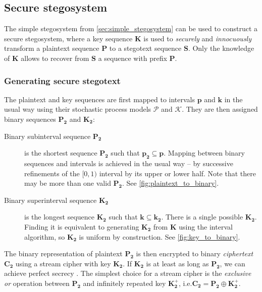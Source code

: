 \documentclass[draft]{IIBproject}
\makeatletter
\DeclareRobustCommand*{\ie}{i.e.\@\xspace}
\DeclareRobustCommand*{\AbbreviationWithDot}[1]{\@ifnextchar{.}{#1}{#1.\@\xspace}}
\DeclareRobustCommand*{\iid}{\AbbreviationWithDot{i.i.d}}
\makeatother
\begin{document}
\FloatBarrier
\subsection{Secure stegosystem}
\label{sec:secure_stegosystem}

The simple stegosystem from \cref{sec:simple_stegosystem} can be used to construct a secure stegosystem, where a key sequence $\mathbf K$ is used to \emph{securely} and \emph{innocuously} transform a plaintext sequence $\mathbf P$ to a stegotext sequence $\mathbf S$. Only the knowledge of $\mathbf K$ allows to recover from $\mathbf S$ a sequence with prefix $\mathbf P$.

\subsubsection{Generating secure stegotext}

The plaintext and key sequences are first mapped to intervals $\mathbf p$ and $\mathbf k$ in the usual way using their stochastic process models $\mathcal P$ and $\mathcal K$. They are then assigned binary sequences $\mathbf{P_2}$ and $\mathbf{K_2}$:

\begin{description}

\item[Binary subinterval sequence $\mathbf{P_2}$] is the shortest sequence $\mathbf{P_2}$ such that $\mathbf {p_2} \subseteq \mathbf p$. Mapping between binary sequences and intervals is achieved in the usual way -- by successive refinements of the $[0,1)$ interval by its upper or lower half. Note that there may be more than one valid $\mathbf{P_2}$. See \cref{fig:plaintext_to_binary}.

\item[Binary superinterval sequence $\mathbf{K_2}$] is the longest sequence $\mathbf{K_2}$ such that $\mathbf k \subseteq \mathbf {k_2}$. There is a single possible $\mathbf{K_2}$. Finding it is equivalent to generating $\mathbf{K_2}$ from $\mathbf K$ using the interval algorithm, so $\mathbf{K_2}$ is \iid uniform by construction. See \cref{fig:key_to_binary}.

\end{description}

The binary representation of plaintext $\mathbf{P_2}$ is then encrypted to binary \emph{ciphertext} $\mathbf{C_2}$ using a stream cipher with key $\mathbf{K_2}$. If $\mathbf{K_2}$ is at least as long as $\mathbf{P_2}$, we can achieve perfect secrecy \cite{shannon1949communication}. The simplest choice for a stream cipher is the \emph{exclusive or} operation between $\mathbf{P_2}$ and infinitely repeated key $\mathbf{K^+_2}$, \ie $\mathbf{C_2} = \mathbf{P_2} \oplus \mathbf{K^+_2}$.
\end{document}
